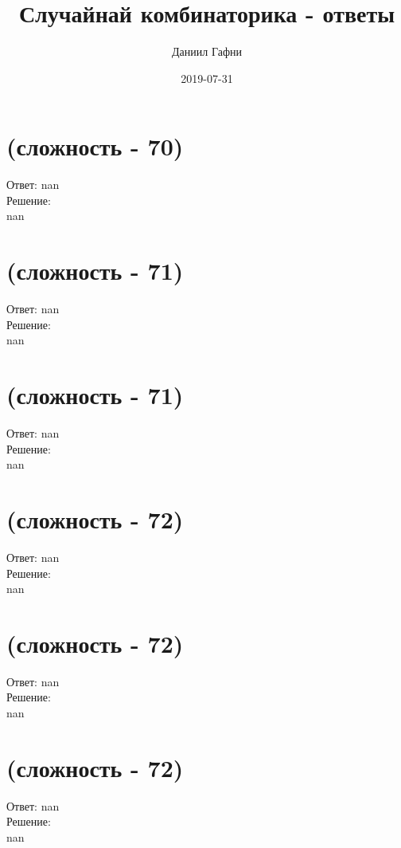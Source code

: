 \documentclass[a4paper,11pt]{article}%
\title{Случайнай комбинаторика {-} ответы}%
\author{Даниил Гафни}%
\date{2019{-}07{-}31}%
\begin{document}
%
\normalsize%
\maketitle%
\section{(сложность {-} 70)}%
\label{sec:( {-} 70)}%
\hspace{3ex} Ответ: nan \\%
%
\hspace*{3ex} Решение: \\%
nan

%
\section{(сложность {-} 71)}%
\label{sec:( {-} 71)}%
\hspace{3ex} Ответ: nan \\%
%
\hspace*{3ex} Решение: \\%
nan

%
\section{(сложность {-} 71)}%
\label{sec:( {-} 71)}%
\hspace{3ex} Ответ: nan \\%
%
\hspace*{3ex} Решение: \\%
nan

%
\section{(сложность {-} 72)}%
\label{sec:( {-} 72)}%
\hspace{3ex} Ответ: nan \\%
%
\hspace*{3ex} Решение: \\%
nan

%
\section{(сложность {-} 72)}%
\label{sec:( {-} 72)}%
\hspace{3ex} Ответ: nan \\%
%
\hspace*{3ex} Решение: \\%
nan

%
\section{(сложность {-} 72)}%
\label{sec:( {-} 72)}%
\hspace{3ex} Ответ: nan \\%
%
\hspace*{3ex} Решение: \\%
nan
\end{document}
